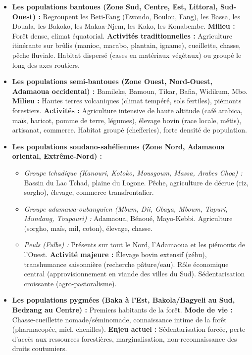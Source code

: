 \documentclass[11pt]{article}
\begin{document}
\begin{itemize}
    \item \textbf{Les populations bantoues (Zone Sud, Centre, Est, Littoral, Sud-Ouest) :} Regroupent les Beti-Fang (Ewondo, Boulou, Fang), les Bassa, les Douala, les Bakoko, les Makaa-Njem, les Kako, les Konabembe. \textbf{Milieu :} Forêt dense, climat équatorial. \textbf{Activités traditionnelles :} Agriculture itinérante sur brûlis (manioc, macabo, plantain, igname), cueillette, chasse, pêche fluviale. Habitat dispersé (cases en matériaux végétaux) ou groupé le long des axes routiers.
    \item \textbf{Les populations semi-bantoues (Zone Ouest, Nord-Ouest, Adamaoua occidental) :} Bamileke, Bamoun, Tikar, Bafia, Widikum, Mbo. \textbf{Milieu :} Hautes terres volcaniques (climat tempéré, sols fertiles), piémonts forestiers. \textbf{Activités :} Agriculture intensive de haute altitude (café arabica, maïs, haricot, pomme de terre, légumes), élevage bovin (race locale, métis), artisanat, commerce. Habitat groupé (chefferies), forte densité de population.
    \item \textbf{Les populations soudano-sahéliennes (Zone Nord, Adamaoua oriental, Extrême-Nord) :} 
    \begin{itemize}
        \item \textit{Groupe tchadique (Kanouri, Kotoko, Mousgoum, Massa, Arabes Choa) :} Bassin du Lac Tchad, plaine du Logone. Pêche, agriculture de décrue (riz, sorgho), élevage, commerce transfrontalier.
        \item \textit{Groupe adamawa-oubanguien (Mbum, Dii, Gbaya, Mboum, Tupuri, Mundang, Toupouri) :} Adamaoua, Bénoué, Mayo-Kebbi. Agriculture (sorgho, maïs, mil, coton), élevage, chasse.
        \item \textit{Peuls (Fulbe) :} Présents sur tout le Nord, l'Adamaoua et les piémonts de l'Ouest. \textbf{Activité majeure :} Élevage bovin extensif (zébu), transhumance saisonnière (recherche pâture/eau). Rôle économique central (approvisionnement en viande des villes du Sud). Sédentarisation croissante (agro-pastoralisme).
    \end{itemize}
    \item \textbf{Les populations pygmées (Baka à l'Est, Bakola/Bagyeli au Sud, Bedzang au Centre) :} Premiers habitants de la forêt. \textbf{Mode de vie :} Chasse-cueillette nomade/séminomade, connaissance intime de la forêt (pharmacopée, miel, chenilles). \textbf{Enjeu actuel :} Sédentarisation forcée, perte d'accès aux ressources forestières, marginalisation, non-reconnaissance des droits coutumiers.
\end{itemize}
\end{document}
